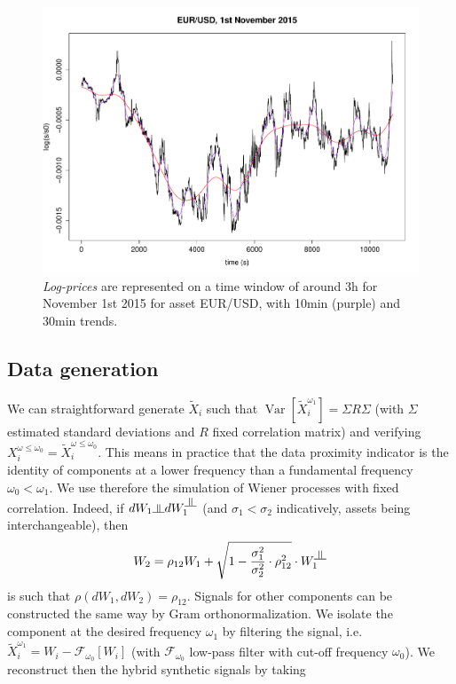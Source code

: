 \documentclass{bmcart}
\DeclareMathOperator{\Var}{Var}
\newcommand{\Varb}[1]{\ensuremath{\Var\!\left[#1\right]}}
\newcommand{\indep}{\rotatebox[origin=c]{90}{$\models$}}
\begin{document}
      
\begin{figure}[h!]
\includegraphics[width=\columnwidth]{figures/asset/ex_filtering}
\caption{ \emph{Log-prices} are represented on a time window of around 3h for November 1st 2015 for asset EUR/USD, with 10min (purple) and 30min trends.\label{fig:example_signal}}
\end{figure}

\subsection*{Data generation}


We can straightforward generate $\tilde{X}_i$ such that $\Varb{\tilde{X}_i^{\omega_1}}=\Sigma R \Sigma$ (with $\Sigma$ estimated standard deviations and $R$ fixed correlation matrix) and verifying $X_i^{\omega \leq \omega_0} = \tilde{X}_i^{\omega \leq \omega_0}$. This means in practice that the data proximity indicator is the identity of components at a lower frequency than a fundamental frequency $\omega_0 < \omega_1$. We use therefore the simulation of Wiener processes with fixed correlation. Indeed, if $dW_1 \indep dW_1^{\indep}$ (and $\sigma_1 < \sigma_2$ indicatively, assets being interchangeable), then
\[
W_2 = \rho_{12}W_1 + \sqrt{1-\frac{\sigma_1^2}{\sigma_2^2}\cdot\rho_{12}^2}\cdot W_1^{\indep}
\]
is such that $\rho(dW_1,dW_2)=\rho_{12}$. Signals for other components can be constructed the same way by Gram orthonormalization. We isolate the component at the desired frequency $\omega_1$ by filtering the signal, i.e. $\tilde{X}_i^{\omega_1} = W_i - \mathcal{F}_{\omega_0}[W_i]$ (with $\mathcal{F}_{\omega_0}$ low-pass filter with cut-off frequency $\omega_0$). We reconstruct then the hybrid synthetic signals by taking
 
\end{document}
